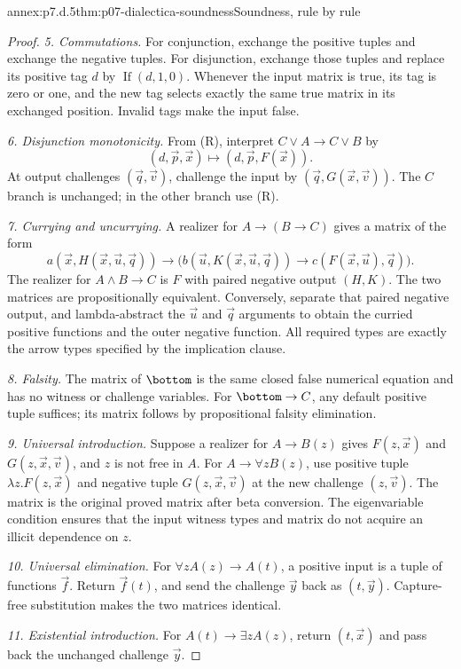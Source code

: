 \begin{annexitem}{annex:p7.d.5}{thm:p07-dialectica-soundness}{Soundness, rule by rule}
\begin{proof}
\emph{5. Commutations.} For conjunction, exchange the positive tuples
and exchange the negative tuples. For disjunction, exchange those tuples
and replace its positive tag \(d\) by
\(\operatorname{If}(d,1,0)\). Whenever the input matrix is true,
its tag is zero or one, and the new tag selects exactly the same true
matrix in its exchanged position. Invalid tags make the input false.

\emph{6. Disjunction monotonicity.} From (R), interpret
\(C\lor A\to C\lor B\) by
\[
 (d,\vec p,\vec x)\longmapsto(d,\vec p,F(\vec x)).
\]
At output challenges \((\vec q,\vec v)\), challenge the input by
\((\vec q,G(\vec x,\vec v))\). The \(C\) branch is unchanged;
in the other branch use (R).

\emph{7. Currying and uncurrying.} A realizer for
\(A\to(B\to C)\) gives a matrix of the form
\[
 a(\vec x,H(\vec x,\vec u,\vec q))\to
 \bigl(b(\vec u,K(\vec x,\vec u,\vec q))\to
 c(F(\vec x,\vec u),\vec q)\bigr).
\]
The realizer for \(A\land B\to C\) is \(F\) with paired
negative output \((H,K)\). The two matrices are propositionally
equivalent. Conversely, separate that paired negative output, and
lambda-abstract the \(\vec u\) and \(\vec q\) arguments to
obtain the curried positive functions and the outer negative function.
All required types are exactly the arrow types specified by the
implication clause.

\emph{8. Falsity.} The matrix of \(\bottom\) is the same closed
false numerical equation and has no witness or challenge variables.
For \(\bottom\to C\), any default positive tuple suffices;
its matrix follows by propositional falsity elimination.

\emph{9. Universal introduction.} Suppose a realizer for
\(A\to B(z)\) gives \(F(z,\vec x)\) and
\(G(z,\vec x,\vec v)\), and \(z\) is not free in \(A\).
For \(A\to\forall zB(z)\), use positive tuple
\(\lambda z.F(z,\vec x)\) and negative tuple
\(G(z,\vec x,\vec v)\) at the new challenge \((z,\vec v)\).
The matrix is the original proved matrix after beta conversion.
The eigenvariable condition ensures that the input witness types and
matrix do not acquire an illicit dependence on \(z\).

\emph{10. Universal elimination.} For
\(\forall zA(z)\to A(t)\), a positive input is a tuple of
functions \(\vec f\). Return \(\vec f(t)\), and send the
challenge \(\vec y\) back as \((t,\vec y)\). Capture-free
substitution makes the two matrices identical.

\emph{11. Existential introduction.} For
\(A(t)\to\exists zA(z)\), return \((t,\vec x)\) and pass
back the unchanged challenge \(\vec y\).


\end{proof}
\end{annexitem}
